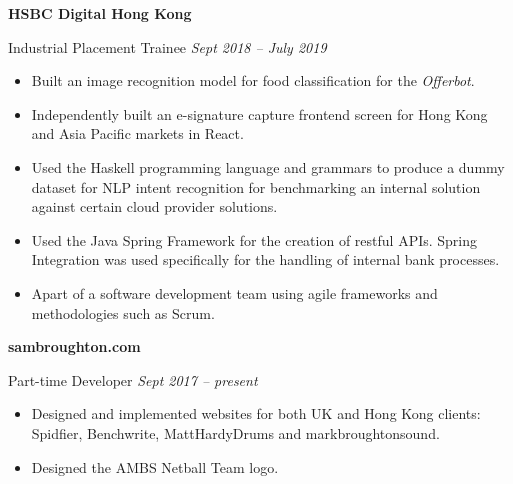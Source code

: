 \documentclass[10pt]{article} %
\begin{document}
\begin{changemargin}{0pt}{0.5pt}
\begin{minipage}[t]{0.5\textwidth}
\begin{changemargin}{5pt}{5pt}

\vspace{5pt}
\textbf{HSBC Digital Hong Kong}\\
\par
 Industrial Placement Trainee \textit{\hfill Sept 2018 -- July 2019} \\
\vspace{-5pt}

\begin{itemize} \itemsep-2pt %
  \item Built an image recognition model for food classification for the \textit{Offerbot}.
  \item Independently built an e-signature capture frontend screen for Hong Kong and Asia Pacific markets in React.
  \item Used the Haskell programming language and grammars to produce a dummy dataset for NLP intent recognition for benchmarking an internal solution against certain cloud provider solutions.
  \item Used the Java Spring Framework for the creation of restful APIs. Spring Integration was used specifically for the handling of internal bank processes.
  \item Apart of a software development team using agile frameworks and methodologies such as Scrum.
\end{itemize}


\vspace{5pt}
\textbf{sambroughton.com}\\
\par
\vspace{-10pt}
Part-time Developer \textit{\hfill Sept 2017 -- present}\\
\vspace{-5pt}

\begin{itemize} \itemsep-2pt %
  \item Designed and implemented websites for both UK and Hong Kong clients: Spidfier, Benchwrite, MattHardyDrums and markbroughtonsound. 
  \item Designed the AMBS Netball Team logo.
  
\end{itemize}


\end{changemargin}
\end{minipage}
\end{changemargin}
\end{document}
